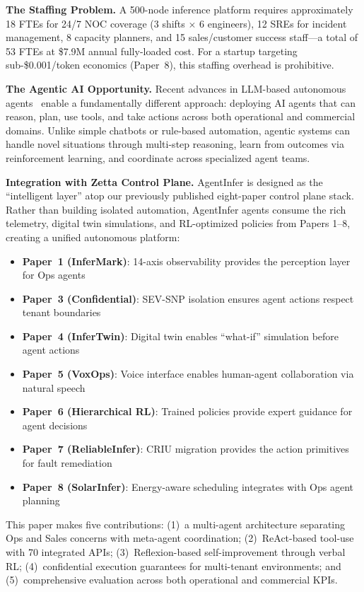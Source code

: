 \documentclass[conference,10pt,letterpaper]{IEEEtran}
\begin{document}
\textbf{The Staffing Problem.} A 500-node inference platform requires approximately 18 FTEs for 24/7 NOC coverage (3 shifts $\times$ 6 engineers), 12 SREs for incident management, 8 capacity planners, and 15 sales/customer success staff---a total of 53 FTEs at \$7.9M annual fully-loaded cost. For a startup targeting sub-\$0.001/token economics (Paper~8), this staffing overhead is prohibitive.

\textbf{The Agentic AI Opportunity.} Recent advances in LLM-based autonomous agents~\cite{yao2023react,wang2024survey,park2023generative} enable a fundamentally different approach: deploying AI agents that can reason, plan, use tools, and take actions across both operational and commercial domains. Unlike simple chatbots or rule-based automation, agentic systems can handle novel situations through multi-step reasoning, learn from outcomes via reinforcement learning, and coordinate across specialized agent teams.

\textbf{Integration with Zetta Control Plane.} AgentInfer is designed as the ``intelligent layer'' atop our previously published eight-paper control plane stack. Rather than building isolated automation, AgentInfer agents consume the rich telemetry, digital twin simulations, and RL-optimized policies from Papers 1--8, creating a unified autonomous platform:

\begin{itemize}
\item \textbf{Paper~1 (InferMark)}: 14-axis observability provides the perception layer for Ops agents
\item \textbf{Paper~3 (Confidential)}: SEV-SNP isolation ensures agent actions respect tenant boundaries
\item \textbf{Paper~4 (InferTwin)}: Digital twin enables ``what-if'' simulation before agent actions
\item \textbf{Paper~5 (VoxOps)}: Voice interface enables human-agent collaboration via natural speech
\item \textbf{Paper~6 (Hierarchical RL)}: Trained policies provide expert guidance for agent decisions
\item \textbf{Paper~7 (ReliableInfer)}: CRIU migration provides the action primitives for fault remediation
\item \textbf{Paper~8 (SolarInfer)}: Energy-aware scheduling integrates with Ops agent planning
\end{itemize}

This paper makes five contributions: (1)~a multi-agent architecture separating Ops and Sales concerns with meta-agent coordination; (2)~ReAct-based tool-use with 70 integrated APIs; (3)~Reflexion-based self-improvement through verbal RL; (4)~confidential execution guarantees for multi-tenant environments; and (5)~comprehensive evaluation across both operational and commercial KPIs.
\end{document}
